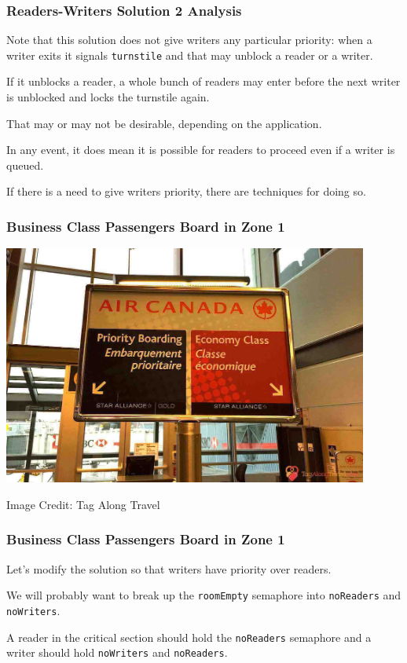 \begin{frame}
\frametitle{Readers-Writers Solution 2 Analysis}

Note that this solution does not give writers any particular priority: when a writer exits it signals \texttt{turnstile} and that may unblock a reader or a writer. 

If it unblocks a reader, a whole bunch of readers may enter before the next writer is unblocked and locks the turnstile again. 

That may or may not be desirable, depending on the application. 

In any event, it does mean it is possible for readers to proceed even if a writer is queued. 

If there is a need to give writers priority, there are techniques for doing so.
\end{frame}


\begin{frame}
\frametitle{Business Class Passengers Board in Zone 1}

\begin{center}
	\includegraphics[width=0.9\textwidth]{images/priority-boarding.jpg}
\end{center}
\hfill Image Credit: Tag Along Travel
\end{frame}


\begin{frame}
\frametitle{Business Class Passengers Board in Zone 1}

Let's modify the solution so that writers have priority over readers.

We will probably want to break up the \texttt{roomEmpty} semaphore into \texttt{noReaders} and \texttt{noWriters}. 

A reader in the critical section should hold the \texttt{noReaders} semaphore and a writer should hold \texttt{noWriters} and \texttt{noReaders}. 

\end{frame}


